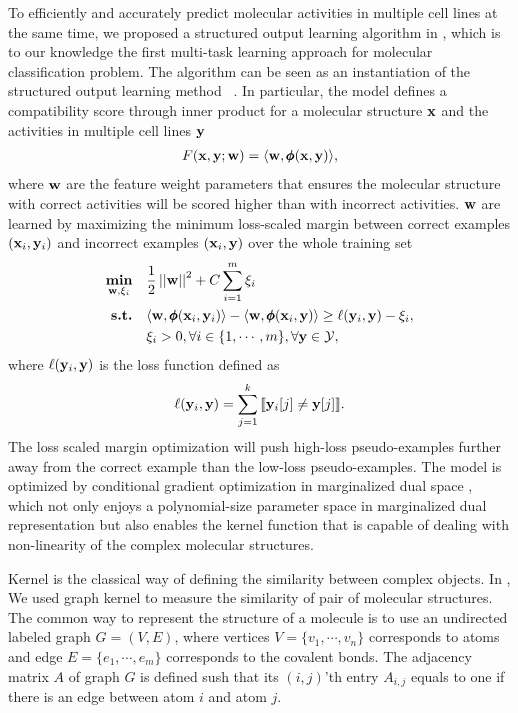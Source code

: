 {To efficiently and accurately predict molecular activities in multiple cell lines at the same time, we proposed a structured output learning algorithm in , which is to our knowledge the first multi-task learning approach for molecular classification problem.
The algorithm can be seen as an instantiation of the structured output learning method \mmcrf\ \citep{rousu06}.
In particular, the model defines a compatibility score through inner product for a molecular structure $\mathbf {x}$ and the activities in multiple cell lines $\mathbf {y}$
\begin{align*}
	F(\mathbf {x},\mathbf {y};\mathbf {w}) = \langle \mathbf {w}, \pmb \phi(\mathbf {x},\mathbf {y}) \rangle,
\end{align*}
where $\mathbf {w}$ are the feature weight parameters that ensures the molecular structure with correct activities will be scored higher than with incorrect activities.
$\mathbf {w}$ are learned by maximizing the minimum loss-scaled margin between correct examples $(\mathbf {x}_i,\mathbf {y}_i)$ and incorrect examples $(\mathbf {x}_i,\mathbf {y})$ over the whole training set
\begin{align*}
	\underset{\mathbf {w},\mathbf{\xi}_i}{\textbf{min}} & \quad \frac{1}{2}\left|\left| \mathbf {w} \right|\right|^2 + C\sum_{i=1}^{m}\xi_i\\
	\textbf{s.t.} &\quad \langle \mathbf {w}, \pmb \phi(\mathbf {x}_i,\mathbf {y}_i) \rangle - \langle \mathbf {w}, \pmb \phi(\mathbf {x}_i,\mathbf {y}) \rangle \ge \ell(\mathbf {y}_i,\mathbf {y})-\xi_i,\\
	&\quad \xi_i>0, \forall i\in\{1,\cdots,m\}, \forall \mathbf {y}\in\mathcal{Y},
\end{align*}
where $\ell(\mathbf {y}_i,\mathbf {y})$ is the loss function defined as
\begin{align*}
	\ell(\mathbf {y}_i,\mathbf {y}) = \sum_{j=1}^{k}{\llbracket \mathbf {y}_i[j]\neq \mathbf {y}[j] \rrbracket}.
\end{align*}
The loss scaled margin optimization will push high-loss pseudo-examples further away from the correct example than the low-loss pseudo-examples.
The model is optimized by conditional gradient optimization \citep{Bertsekas95nonlinear} in marginalized dual space \citep{Taskar04max}, which not only enjoys a polynomial-size parameter space in marginalized dual representation but also enables the kernel function that is capable of dealing with non-linearity of the complex molecular structures.

Kernel is the classical way of defining the similarity between complex objects.
In , We used graph kernel to measure the similarity of pair of molecular structures.
The common way to represent the structure of a molecule is to use an undirected labeled graph $G=(V,E)$, where vertices $V=\{v_1,\cdots,v_n\}$ corresponds to atoms and edge $E=\{e_1,\cdots,e_m\}$ corresponds to the covalent bonds.
The adjacency matrix $A$ of graph $G$ is defined sush that its $(i,j)$'th entry $A_{i,j}$ equals to one if there is an edge between atom $i$ and atom $j$.

}
